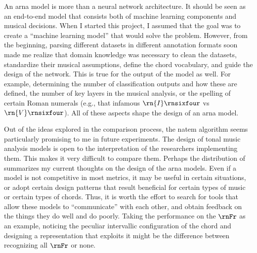 
An \gls{arna} model is more than a neural network
architecture. It should be seen as an end-to-end model that
consists both of machine learning components and musical
decisions. When I started this project, I assumed that the
goal was to create a ``machine learning model'' that would
solve the problem. However, from the beginning, parsing
different datasets in different annotation formats soon made
me realize that domain knowledge was necessary to clean the
datasets, standardize their musical assumptions, define the
chord vocabulary, and guide the design of the network. This
is true for the output of the model as well. For example,
determining the number of classification outputs and how
these are defined, the number of key layers in the musical
analysis, or the spelling of certain Roman numerals (e.g.,
that infamous $\rn{I}\rnsixfour$ vs $\rn{V}\rnsixfour$). All
of these aspects shape the design of an \gls{arna} model.

Out of the ideas explored in the comparison process, the
\gls{natem} algorithm seems particularly promising to me in
future experiments. The design of tonal music analysis
models is open to the interpretation of the researchers
implementing them. This makes it very difficult to compare
them. Perhaps the distribution of 
summarizes my current thoughts on the design of the
\gls{arna} models. Even if a model is not competitive in
most metrics, it may be useful in certain situations, or
adopt certain design patterns that result beneficial for
certain types of music or certain types of chords. Thus, it
is worth the effort to search for tools that allow these
models to ``communicate'' with each other, and obtain
feedback on the things they do well and do poorly. Taking
the performance on the $\rnFr$ as an example, noticing the
peculiar intervallic configuration of the chord and
designing a representation that exploits it might be the
difference between recognizing all $\rnFr$ or none.



